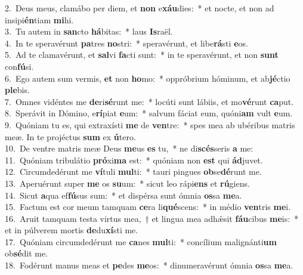 {2.~}Deus meus, clamábo per diem, et \textbf{non} e\textbf{xáu}dies:~* et nocte, et non ad insipi\textbf{én}tiam \textbf{mi}hi.\\
{3.~}Tu autem in \textbf{san}cto \textbf{há}bitas:~* laus \textbf{Is}raël.\\
{4.~}In te speravérunt \textbf{pa}tres \textbf{no}stri:~* speravérunt, et libe\textbf{rá}sti \textbf{e}os.\\
{5.~}Ad te clamavérunt, et \textbf{sal}vi \textbf{fa}cti sunt:~* in te speravérunt, et non \textbf{sunt} con\textbf{fú}si.\\
{6.~}Ego autem sum vermis, \textbf{et} non \textbf{ho}mo:~* oppróbrium hóminum, et ab\textbf{jé}ctio \textbf{ple}bis.\\
{7.~}Omnes vidéntes me \textbf{de}ri\textbf{sé}runt me:~* locúti sunt lábiis, et mo\textbf{vé}runt \textbf{ca}put.\\
{8.~}Sperávit in Dómino, e\textbf{rí}piat \textbf{e}um:~* salvum fáciat eum, quóni\textbf{am} vult \textbf{e}um.\\
{9.~}Quóniam tu es, qui extraxísti \textbf{me} de \textbf{ven}tre:~* spes mea ab ubéribus matris meæ. In te projéctus \textbf{sum} ex \textbf{ú}tero.\\
{10.~}De ventre matris meæ Deus \textbf{me}us \textbf{es} tu,~* ne di\textbf{scés}seris \textbf{a} me:\\
{11.~}Quóniam tribulátio \textbf{pró}xi\textbf{ma} est:~* quóniam non \textbf{est} qui \textbf{ád}juvet.\\
{12.~}Circumdedérunt me \textbf{ví}tuli \textbf{mul}ti:~* tauri pingues \textbf{ob}se\textbf{dé}runt me.\\
{13.~}Aperuérunt super \textbf{me} os \textbf{su}um:~* sicut leo rápi\textbf{ens} et \textbf{rú}giens.\\
{14.~}Sicut \textbf{a}qua ef\textbf{fú}sus sum:~* et dispérsa sunt ómnia \textbf{os}sa \textbf{me}a.\\
{15.~}Factum est cor meum tamquam \textbf{ce}ra li\textbf{qué}scens:~* in médio \textbf{ven}tris \textbf{me}i.\\
{16.~}Aruit tamquam testa virtus mea,~† et lingua mea adhǽsit \textbf{fáu}cibus \textbf{me}is:~* et in púlverem mortis \textbf{de}du\textbf{xí}sti me.\\
{17.~}Quóniam circumdedérunt me \textbf{ca}nes \textbf{mul}ti:~* concílium malignánti\textbf{um} ob\textbf{sé}dit me.\\
{18.~}Fodérunt manus meas et \textbf{pe}des \textbf{me}os:~* dinumeravérunt ómnia \textbf{os}sa \textbf{me}a.\\
